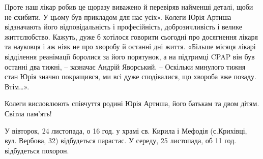 Проте наш лікар робив це щоразу виважено й  перевіряв найменші деталі, щоби не
схибити. У цьому був прикладом для нас усіх». Колеги Юрія Артиша відзначають
його відповідальність і професійність, доброзичливість і велике життєлюбство.
Кажуть, дуже б хотілося говорити сьогодні про досягнення лікаря та науковця і
аж ніяк не про хворобу й останні дні життя. «Більше місяця лікарі відділення
реанімації боролися за його порятунок, а на підтримці CPAP він був останні два
тижні, – зазначає Андрій Яворський. – Оскільки минулого тижня стан Юрія значно
покращився, ми всі дуже сподівалися, що хвороба вже позаду. Втім…».   

Колеги висловлюють співчуття родині Юрія Артиша, його батькам та двом дітям.
Світла пам’ять!

У вівторок, 24  листопада, о 16 год. у храмі св. Кирила і Мефодія (с.Крихівці,
вул. Вербова, 32) відбудеться парастас. У середу, 25 листопада, об 11 год.
відбудеться похорон.
